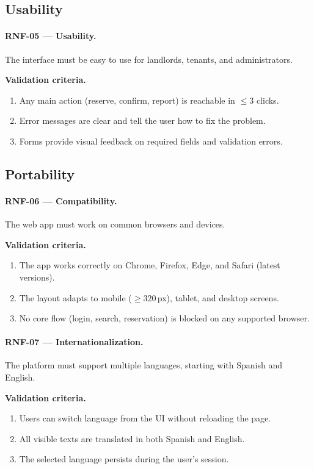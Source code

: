 \documentclass[11pt,a4paper,oneside]{report}
\begin{document}
\subsection{Usability}
\label{nfr:usability}

\paragraph{RNF-05 --- Usability.} \label{req:RNF-05}
The interface must be easy to use for landlords, tenants, and administrators.

\textbf{Validation criteria.}
\begin{enumerate}
\item Any main action (reserve, confirm, report) is reachable in $\leq 3$ clicks.
\item Error messages are clear and tell the user how to fix the problem.
\item Forms provide visual feedback on required fields and validation errors.
\end{enumerate}

\subsection{Portability}
\label{nfr:portability}

\paragraph{RNF-06 --- Compatibility.} \label{req:RNF-06}
The web app must work on common browsers and devices.

\textbf{Validation criteria.}
\begin{enumerate}
\item The app works correctly on Chrome, Firefox, Edge, and Safari (latest versions).
\item The layout adapts to mobile ($\geq 320$\,px), tablet, and desktop screens.
\item No core flow (login, search, reservation) is blocked on any supported browser.
\end{enumerate}

\paragraph{RNF-07 --- Internationalization.} \label{req:RNF-07}
The platform must support multiple languages, starting with Spanish and English.

\textbf{Validation criteria.}
\begin{enumerate}
\item Users can switch language from the UI without reloading the page.
\item All visible texts are translated in both Spanish and English.
\item The selected language persists during the user's session.
\end{enumerate}
\end{document}
